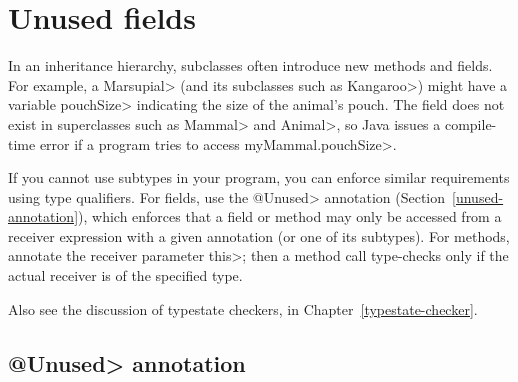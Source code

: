 \section{Unused fields\label{unused-fields}}

In an inheritance hierarchy, subclasses often introduce new methods and
fields.  For example, a \<Marsupial> (and its subclasses such as
\<Kangaroo>) might have a variable \<pouchSize> indicating the size of the animal's
pouch.  The field does not exist in superclasses such as
\<Mammal> and \<Animal>, so Java issues a compile-time
error if a program tries to access \<myMammal.pouchSize>.

If you cannot use subtypes in your program, you can enforce similar
requirements using type qualifiers.
For fields, use the \<@Unused> annotation (Section~\ref{unused-annotation}), which enforces that a field or method may only
be accessed from a receiver expression with a given annotation (or one of
its subtypes).
For methods, annotate the receiver parameter \<this>; then a method call
type-checks only if the actual receiver is of the specified type.




Also see the discussion of typestate checkers, in
Chapter~\ref{typestate-checker}.


\subsection{\<@Unused> annotation\label{unused-annotation}}

